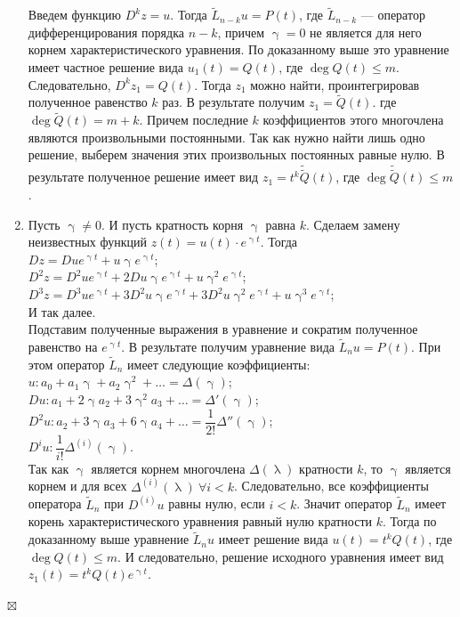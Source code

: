 \documentclass[a4paper, 12pt]{report}
\newenvironment{Proof} %
{\par\noindent{$\blacklozenge$}} %
{\hfill$\scriptstyle\boxtimes$}
\renewcommand{\lambda}{\uplambda}
\begin{document}
\begin{Proof}
\begin{enumerate}
	Введем функцию $D^kz = u$. Тогда $\widetilde{L}_{n-k}u = P(t)$, где $\widetilde{L}_{n-k}$ --- оператор дифференцирования порядка $n-k$, причем $\upgamma = 0$ не является для него корнем характеристического уравнения. По доказанному выше это уравнение имеет частное решение вида $u_1(t) = Q(t)$, где $\deg Q(t) \leqslant m$. Следовательно, $D^kz_1 = Q(t)$. Тогда $z_1$ можно найти, проинтегрировав полученное равенство $k$ раз. В результате получим $z_1 = \widetilde{Q}(t)$. где $\deg \widetilde{Q}(t) = m + k$. Причем последние $k$ коэффициентов этого многочлена являются произвольными постоянными. Так как нужно найти лишь одно решение, выберем значения этих произвольных постоянных равные нулю. В результате полученное решение имеет вид $z_1 = t^k\widetilde{\widetilde{Q}}(t)$, где $\deg \widetilde{\widetilde{Q}}(t) \leqslant m$.
	\item Пусть $\upgamma \ne 0$. И пусть кратность корня $\upgamma$ равна $k$. Сделаем замену неизвестных функций $z(t) = u(t)\cdot e^{\upgamma t}$. Тогда\\
	$Dz = Due^{\upgamma t} + u \upgamma e ^{\upgamma t}$;\\
	$D^2 z = D^2 u e^{\upgamma t} + 2 D u \upgamma e^{\upgamma t} + u\upgamma^2 e^{\upgamma t}$;\\
	$D^3 z = D^3 u e^{\upgamma t} + 3 D^2 u \upgamma e^{\upgamma t} + 3 D^2 u \upgamma^2 e^{\upgamma t}+ u\upgamma^3 e^{\upgamma t}$;\\
	И так далее.\\
	Подставим полученные выражения в уравнение и сократим полученное равенство на $e^{\upgamma t}$. В результате получим уравнение вида $\widetilde{L}_nu = P(t)$. При этом оператор $\widetilde{L}_n$ имеет следующие коэффициенты:\\
	$u : a_0 + a_1 \upgamma + a_2 \upgamma^2 + \ldots = \Delta (\upgamma)$;\\
	$Du : a_1 + 2\upgamma a_2 + 3\upgamma^2a_3 + \ldots = \Delta' (\upgamma)$;\\
	$D^2 u : a_2 + 3\upgamma a_3 + 6\upgamma a_4 + \ldots = \dfrac{1}{2!}\Delta''(\upgamma)$;\\
	$D^i u: \dfrac{1}{i!}\Delta^{(i)}(\upgamma).$\\
	Так как $\upgamma$ является корнем многочлена $\Delta(\lambda)$ кратности $k$, то $\upgamma$ является корнем и для всех $\Delta^{(i)}(\lambda)\ \forall i < k$. Следовательно, все коэффициенты оператора $\widetilde{L}_n$ при $D^{(i)}u$ равны нулю, если $i < k$. Значит оператор $\widetilde{L}_n$ имеет корень характеристического уравнения равный нулю кратности $k$. Тогда по доказанному выше уравнение $\widetilde{L}_n u$ имеет решение вида $u(t) = t^k Q(t)$, где $\deg Q(t)\leqslant m$. И следовательно, решение исходного уравнения имеет вид $z_1(t) = t^k Q(t)e^{\upgamma t}$.
\end{enumerate}
\end{Proof}
\end{document}
